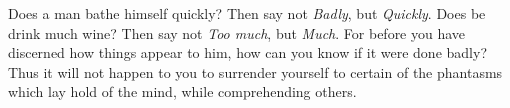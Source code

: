 Does   a  man   bathe  himself   quickly?  Then   say  not   \emph{Badly},  but
\emph{Quickly}. Does  be drink  much wine?  Then say  not \emph{Too  much}, but
\emph{Much}. For  before you have discerned  how things appear to  him, how can
you know  if it were done  badly? Thus it will  not happen to you  to surrender
yourself  to  certain of  the  phantasms  which lay  hold  of  the mind,  while
comprehending others.
